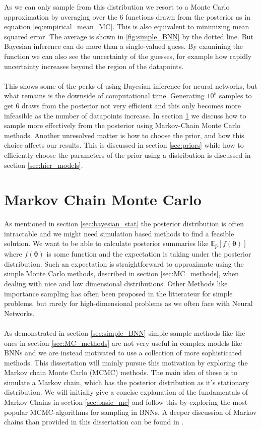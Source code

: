 As we can only sample from this distribution we resort to a Monte Carlo approximation by averaging over the 6 functions drawn from the posterior as in equation \ref{eq:empirical_mean_MC}. This is also equivalent to minimizing mean squared error. The average is shown in \ref{fig:simple_BNN} by the dotted line. But Bayesian inference can do more than a single-valued guess. By examining the function we can also see the uncertainty of the guesses, for example how rapidly uncertainty increases beyond the region of the datapoints. 
\\
\\
This shows some of the perks of using Bayesian inference for neural networks, but what remains is the downside of computational time. Generating $10^5$ samples to get 6 draws from the posterior not very efficient and this only becomes more infeasible as the number of datapoints increase. In section \ref{sec:MCMC} we discuss how to sample more effectively from the posterior using Markov-Chain Monte Carlo methods. Another unresolved matter is how to choose the prior, and how this choice affects our results. This is discussed in section \ref{sec:priors} while how to efficiently choose the parameters of the prior using a distribution is discussed in section \ref{sec:hier_models}.



\section{Markov Chain Monte Carlo}\label{sec:MCMC}
 As mentioned in section \ref{sec:bayesian_stat} the posterior distribution is often intractable and we might need simulation based methods to find a feasible solution. We want to be able to calculate posterior summaries like $\mathbb{E}_{\hat{p}}\left[f(\boldsymbol{\theta})\right]$ where $f(\boldsymbol{\theta})$ is some function and the expectation is taking under the posterior distribution. Such an expectation is straightforward to approximate using the simple Monte Carlo methods, described in section \ref{sec:MC_methods}, when dealing with nice and low dimensional distributions. Other Methods like importance sampling has often been proposed in the litterateur for simple problems, but rarely for high-dimensional problems as we often face with Neural Networks.
 \\
 \\
As demonstrated in section \ref{sec:simple_BNN} simple sample methods like the ones in section \ref{sec:MC_methods} are not very useful in complex models like BNNs and we are instead motivated to use a collection of more sophisticated methods. This dissertation will mainly pursue this motivation by exploring the Markov chain Monte Carlo (MCMC) methods. The main idea of these is to simulate a Markov chain, which has the posterior distribution as it's stationary distribution. We will initially give a concise explanation of the fundamentals of Markov Chains in section \ref{sec:basic_mc} and follow this by exploring the most popular MCMC-algorithms for sampling in BNNs.
A deeper discussion of Markov chains than provided in this dissertation can be found in \cite{lawler2006introduction}.
 
